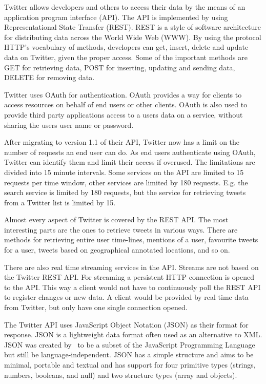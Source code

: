 Twitter allows developers and others to access their data by the means of an application program interface (API). The API is implemented by using Representational State Transfer (REST). REST is a style of software architecture for distributing data across the World Wide Web (WWW). By using the protocol HTTP's vocabulary of methods, developers can get, insert, delete and update data on Twitter, given the proper access. Some of the important methods are GET for retrieving data, POST for inserting, updating and sending data, DELETE for removing data.~\citep{article:rest}

Twitter uses OAuth for authentication. OAuth provides a way for clients to access resources on behalf of end users or other clients. OAuth is also used to provide third party applications access to a users data on a service, without sharing the users user name or password.~\citep{site:oauth}

After migrating to version 1.1 of their API, Twitter now has a limit on the number of requests an end user can do. As end users authenticate using OAuth, Twitter can identify them and limit their access if overused. The limitations are divided into 15 minute intervals. Some services on the API are limited to 15 requests per time window, other services are limited by 180 requests. E.g. the search service is limited by 180 requests, but the service for retrieving tweets from a Twitter list is limited by 15.~\citep{site:twitterlimit}

Almost every aspect of Twitter is covered by the REST API. The most interesting parts are the ones to retrieve tweets in various ways. There are methods for retrieving entire user time-lines, mentions of a user, favourite tweets for a user, tweets based on geographical annotated locations, and so on.~\citep{site:twitterapi}

There are also real time streaming services in the API. Streams are not based on the Twitter REST API. For streaming a persistent HTTP connection is opened to the API. This way a client would not have to continuously poll the REST API to register changes or new data. A client would be provided by real time data from Twitter, but only have one single connection opened.~\citep{site:twitterstream}

The Twitter API uses JavaScript Object Notation (JSON) as their format for response. JSON is a lightweight data format often used as an alternative to XML. JSON was created by~\citeauthor{site:json} to be a subset of the JavaScript Programming Language but still be language-independent. JSON has a simple structure and aims to be minimal, portable and textual and has support for four primitive types (strings, numbers, booleans, and null) and two structure types (array and objects).~\citep{site:json}

